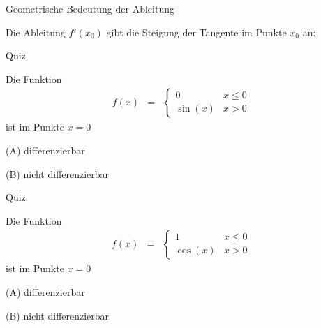 \documentclass[german]{beamer}
\newcommand{\bq}{\begin{eqnarray*}}
\newcommand{\eq}{\end{eqnarray*}}
\begin{document}
\begin{frame}{Geometrische Bedeutung der Ableitung}

Die Ableitung $f'(x_0)$ gibt die \alert{Steigung der Tangente} im Punkte $x_0$ an:
\vspace*{10mm}
\begin{center}
\end{center}

\end{frame}

\begin{frame}{Quiz}

Die Funktion
\bq
 f(x) & = & \left\{\begin{array}{ll} 0 & x \le 0 \\ \sin(x) & x>0 \end{array} \right.
\eq
ist im Punkte $x=0$
\begin{description}
\item{(A)} differenzierbar
\item{(B)} nicht differenzierbar
\end{description}

\end{frame}

\begin{frame}{Quiz}

Die Funktion
\bq
 f(x) & = & \left\{\begin{array}{ll} 1 & x \le 0 \\ \cos(x) & x>0 \end{array} \right.
\eq
ist im Punkte $x=0$
\begin{description}
\item{(A)} differenzierbar
\item{(B)} nicht differenzierbar
\end{description}

\end{frame}
\end{document}
